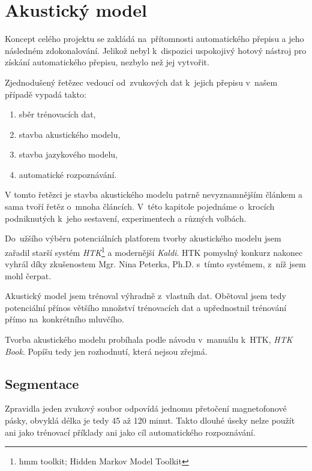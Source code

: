 \chapter{Akustický model}
\label{kap:akusticky-model}


Koncept celého projektu se zakládá na~přítomnosti automatického přepisu a jeho
následném zdokonalování. Jelikož nebyl k~dispozici uspokojivý hotový nástroj pro
získání automatického přepisu, nezbylo než jej vytvořit.

Zjednodušený řetězec vedoucí od~zvukových dat k~jejich přepisu v~našem případě
vypadá takto:\begin{enumerate}
\item{sběr trénovacích dat,}
\item{stavba akustického modelu,}
\item{stavba jazykového modelu,}
\item{automatické rozpoznávání.}
\end{enumerate}

V tomto řetězci je stavba akustického modelu patrně nevyznamnějším článkem a
sama tvoří řetěz o~mnoha článcích. V~této kapitole pojednáme o~krocích
podniknutých k~jeho sestavení, experimentech a různých volbách.

Do~užšího výběru potenciálních platforem tvorby akustického modelu jsem zařadil
starší systém \textit{HTK}\footnote{hmm toolkit; Hidden Markov Model Toolkit} a
modernější \textit{Kaldi}. HTK pomyslný konkurz nakonec vyhrál díky zkušenostem
Mgr. Nina Peterka, Ph.D. s~tímto systémem, z~níž jsem mohl čerpat.

Akustický model jsem trénoval výhradně z~vlastníh dat. Obětoval jsem tedy
potenciální přínos většího množství trénovacích dat a upřednostnil trénování
přímo na~konkrétního mluvčího.

Tvorba akustického modelu probíhala podle návodu v~manuálu k~HTK, \textit{HTK
Book}. Popíšu tedy jen rozhodnutí, která nejsou zřejmá.

\section{Segmentace}

Zpravidla jeden zvukový soubor odpovídá jednomu přetočení magnetofonové pásky,
obvyklá délka je tedy 45 až 120 minut. Takto dlouhé úseky nelze použít ani jako
trénovací příklady ani jako cíl automatického rozpoznávání.


